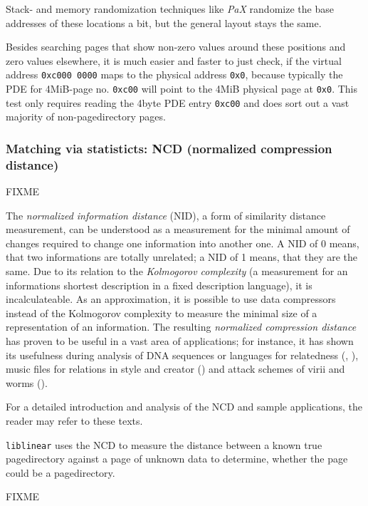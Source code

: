 Stack- and memory randomization techniques like \emph{PaX} randomize the base
addresses of these locations a bit, but the general layout stays the same.

Besides searching pages that show non-zero values around these positions and
zero values elsewhere, it is much easier and faster to just check, if the
virtual address \texttt{0xc000~0000} maps to the physical address \texttt{0x0},
because typically the PDE for 4MiB-page no. \texttt{0xc00} will point to the
4MiB physical page at \texttt{0x0}. This test only requires reading the 4byte
PDE entry \texttt{0xc00} and does sort out a vast majority of non-pagedirectory
pages.



\subsubsection{Matching via statisticts: NCD (normalized compression distance)}

FIXME

The \emph{normalized information distance} (NID), a form of similarity distance
measurement, can be understood as a measurement for the minimal amount of
changes required to change one information into another one.  A NID of 0 means,
that two informations are totally unrelated; a NID of 1 means, that they are the
same.  Due to its relation to the \emph{Kolmogorov complexity} (a measurement
for an informations shortest description in a fixed description language), it is
incalculateable.  As an approximation, it is possible to use data compressors
instead of the Kolmogorov complexity to measure the minimal size of a
representation of an information. The resulting \emph{normalized compression
distance} has proven to be useful in a vast area of applications; for instance,
it has shown its usefulness during analysis of DNA sequences or languages for
relatedness (\cite{clustering_by_compression:2005},
\cite{similarity_matrix:2004}), music files for relations in style and creator
(\cite{clustering_by_compression:2005}) and attack schemes of virii and worms
(\cite{analysing_worms_with_ncd:2006}).

For a detailed introduction and analysis of the NCD and sample applications, the
reader may refer to these texts.

\texttt{liblinear} uses the NCD to measure the distance between a known true
pagedirectory against a page of unknown data to determine, whether the page
could be a pagedirectory.

FIXME

